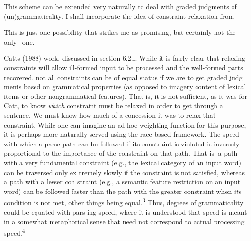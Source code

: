 \begin{styleTextbody}
This scheme can be extended very naturally to deal with graded judgments of (un)grammaticality. I shall incorporate the idea of constraint relaxation from
\end{styleTextbody}


\setcounter{listWWNumxxleveli}{1}
\begin{listWWNumxxleveli}
\item 
\begin{styleStandard}
This is just one possibility that strikes me as promising, but certainly not the only \ one.
\end{styleStandard}


\end{listWWNumxxleveli}
\clearpage\setcounter{page}{1}\begin{styleStandard}
Catt{\textquotesingle}s (1988) work, discussed in section 6.2.l. While it is fairly clear that relaxing constraints will allow ill-formed input to be processed and the well-formed parts recovered, not all constraints can be of equal status if we are to get graded judg\- ments based on grammatical properties (as opposed to imagery content of lexical items or other nongrammatical features). That is, it is not sufficient, as it was for Catt, to know \textit{which}\textit{ }constraint must be relaxed in order to get through a sentence. We must know how much of a concession it was to relax that constraint. While one can imagine an ad hoe weighting function for this purpose, it is perhaps more naturally served using the race-based framework. The speed with which a parse path can be followed if its constraint is violated is inversely proportional to the importance of the constraint on that path. That is, a path with a very fundamental constraint (e.g., the lexical category of an input word) can be traversed only ex\- tremely slowly if the constraint is not satisfied, whereas a path with a lesser con\- straint (e.g., a semantic feature restriction on an input word) can be followed faster than the path with the greater constraint when \textit{its}\textit{ }condition is not met, other things being equal.\textsuperscript{3}\textsuperscript{ }Thus, degrees of grammaticality could be equated with pars\- ing speed, where it is understood that speed is meant in a somewhat metaphorical sense that need not correspond to actual processing speed.\textsuperscript{4}
\end{styleStandard}


